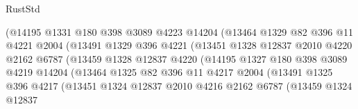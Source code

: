 \begin{lexlean}{RustStd}
\begin{coremodule}
                              (@14195
                                @1331
                                @180
                                @398
                                @3089
                                @4223
                                @14204
                                (@13464
                                  @1329
                                  @82
                                  @396
                                  @11
                                  @4221
                                  @2004
                                  (@13491
                                    @1329
                                    @396
                                    @4221
                                    (@13451
                                      @1328
                                      @12837
                                      @2010
                                      @4220
                                      @2162
                                      @6787
                                      (@13459
                                        @1328
                                        @12837
                                        @4220
                                        (@14195
                                          @1327
                                          @180
                                          @398
                                          @3089
                                          @4219
                                          @14204
                                          (@13464
                                            @1325
                                            @82
                                            @396
                                            @11
                                            @4217
                                            @2004
                                            (@13491
                                              @1325
                                              @396
                                              @4217
                                              (@13451
                                                @1324
                                                @12837
                                                @2010
                                                @4216
                                                @2162
                                                @6787
                                                (@13459
                                                  @1324
                                                  @12837

\end{coremodule}
\end{lexlean}

